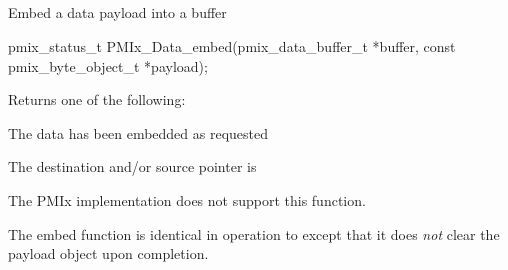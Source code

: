 
\subsection{}

\summary

Embed a data payload into a buffer

\format

\cspecificstart
\begin{codepar}
pmix_status_t
PMIx_Data_embed(pmix_data_buffer_t *buffer,
                const pmix_byte_object_t *payload);
\end{codepar}
\cspecificend

\begin{arglist}
\end{arglist}

Returns one of the following:
\begin{constantdesc}
\item {} The data has been embedded as requested
\item {} The destination and/or source pointer is 
\item {} The \ac{PMIx} implementation does not support this function.
\end{constantdesc}

\descr

The embed function is identical in operation to 
except that it does \emph{not} clear the payload object upon completion.

